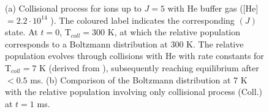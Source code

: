 \begin{figure}[!htb]
    \hfill
    
    \caption{(a) Collisional process for \CD ions up to $J=5$ with He buffer gas ([He]$=2.2 \cdot 10^{14}$ \percc). The coloured label indicates the corresponding \CD$(J)$ state. At $t=0$, T$_{coll}=300$ K, at which the relative population corresponds to a Boltzmann distribution at 300 K. The relative population evolves through collisions with He with rate constants for T$_{coll}=7$ K (derived from \cite{Werfelli2017}), subsequently reaching equilibrium after $<0.5$ ms. (b) Comparison of the Boltzmann distribution at 7 K with the relative population involving only collisional process (Coll.) at $t=1$ ms.}
    \label{fig:ROSAA-sim-collisional-boltzman-comparision}
\end{figure}